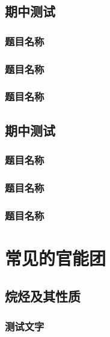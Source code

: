 \documentclass[color=orange]{textbook-cn}%
\begin{document}
\begin{Quiz}
\section{期中测试}
\subsection{题目名称}
\lipsum[1-5]
\subsection{题目名称}
\lipsum[1-5]
\subsection{题目名称}
\lipsum[1-5]
\end{Quiz}


\begin{Quiz}
\section{期中测试}
\subsection{题目名称}
\lipsum[1-5]
\subsection{题目名称}
\lipsum[1-5]
\subsection{题目名称}
\lipsum[1-5]
\end{Quiz}


\chapter{常见的官能团}

\section{烷烃及其性质}
\begin{Point}
\lipsum[1]
\end{Point}

\subsection{测试文字}
\end{document}
